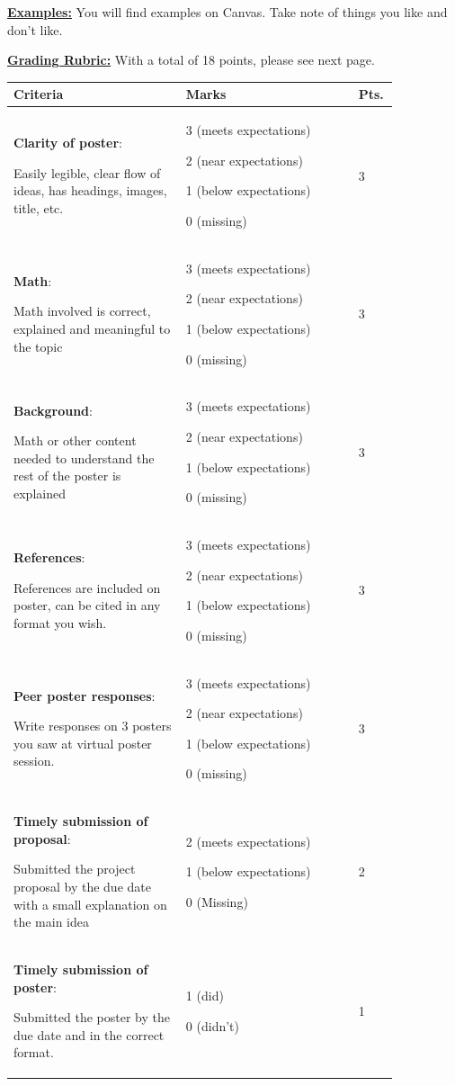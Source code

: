 \documentclass[12pt]{article}
\begin{document}
\underline{\textbf{Examples:}} You will find examples on Canvas. Take note of things you like and don't like.

\textbf{\underline{Grading Rubric:}} With a total of 18 points, please see next page.
\begin{table}[h!]
    \centering
    \begin{tabular}{p{0.4\linewidth}p{0.4\linewidth}p{0.05\linewidth}}\toprule
        \textbf{Criteria} & \textbf{Marks} & \textbf{Pts.}\\ \midrule
        {\textbf{Clarity of poster}:\par Easily legible, clear flow of ideas, has headings, images, title, etc.}& 3 (meets expectations)\par 2 (near expectations)\par 1 (below expectations)\par 0 (missing) & 3\\\midrule
        \textbf{Math}:\par Math involved is correct,  explained and meaningful to the topic& 3 (meets expectations)\par 2 (near expectations)\par 1 (below expectations)\par 0 (missing) & 3\\\midrule
        \textbf{Background}:\par Math or other content needed to understand the rest of the poster is explained & 3 (meets expectations)\par 2 (near expectations)\par 1 (below expectations)\par 0 (missing) & 3\\\midrule
        \textbf{References}:\par References are included on poster, can be cited in any format you wish. &3 (meets expectations)\par 2 (near expectations)\par 1 (below expectations)\par 0 (missing) & 3\\\midrule
        \textbf{Peer poster responses}:\par Write responses on $3$ posters you saw at  virtual poster session.& 3 (meets expectations)\par 2 (near expectations)\par 1 (below expectations)\par 0 (missing) & 3\\\midrule
        \textbf{Timely submission of proposal}:\par Submitted the project proposal by the due date with a small explanation on the main idea& 2 (meets expectations)\par 1 (below expectations)\par 0 (Missing)& 2\\\midrule
        \textbf{Timely submission of poster}:\par Submitted the poster by the due date and in the correct format.& 1 (did)\par 0 (didn't)& 1\\
   \bottomrule
    \end{tabular}
    \end{table}
\end{document}
